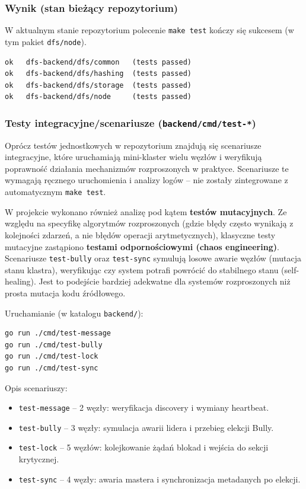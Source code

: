 \documentclass[12pt,a4paper]{article}
\begin{document}
	\subsubsection{Wynik (stan bieżący repozytorium)}
	W aktualnym stanie repozytorium polecenie \texttt{make test} kończy się sukcesem (w tym pakiet \texttt{dfs/node}).
	\begin{verbatim}
ok   dfs-backend/dfs/common   (tests passed)
ok   dfs-backend/dfs/hashing  (tests passed)
ok   dfs-backend/dfs/storage  (tests passed)
ok   dfs-backend/dfs/node     (tests passed)
	\end{verbatim}

	\subsubsection{Testy integracyjne/scenariusze (\texttt{backend/cmd/test-*})}
	Oprócz testów jednostkowych w repozytorium znajdują się scenariusze integracyjne, które uruchamiają mini-klaster wielu węzłów i weryfikują poprawność działania mechanizmów rozproszonych w praktyce. Scenariusze te wymagają ręcznego uruchomienia i analizy logów -- nie zostały zintegrowane z automatycznym \texttt{make test}.
	
	W projekcie wykonano również analizę pod kątem \textbf{testów mutacyjnych}. Ze względu na specyfikę algorytmów rozproszonych (gdzie błędy często wynikają z kolejności zdarzeń, a nie błędów operacji arytmetycznych), klasyczne testy mutacyjne zastąpiono \textbf{testami odpornościowymi (chaos engineering)}. Scenariusze \texttt{test-bully} oraz \texttt{test-sync} symulują losowe awarie węzłów (mutacja stanu klastra), weryfikując czy system potrafi powrócić do stabilnego stanu (self-healing). Jest to podejście bardziej adekwatne dla systemów rozproszonych niż prosta mutacja kodu źródłowego.

	Uruchamianie (w katalogu \texttt{backend/}):
	\begin{verbatim}
go run ./cmd/test-message
go run ./cmd/test-bully
go run ./cmd/test-lock
go run ./cmd/test-sync
	\end{verbatim}
	Opis scenariuszy:
	\begin{itemize}
		\item \texttt{test-message} -- 2 węzły: weryfikacja discovery i wymiany heartbeat.
		\item \texttt{test-bully} -- 3 węzły: symulacja awarii lidera i przebieg elekcji Bully.
		\item \texttt{test-lock} -- 5 węzłów: kolejkowanie żądań blokad i wejścia do sekcji krytycznej.
		\item \texttt{test-sync} -- 4 węzły: awaria mastera i synchronizacja metadanych po elekcji.
	\end{itemize}
	
\end{document}
